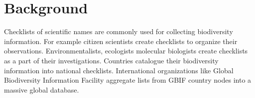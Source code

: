 \documentclass{bmcart}
\begin{document}
\begin{frontmatter}
\begin{abstractbox}
\begin{keyword}
\end{keyword}


\end{abstractbox}
%

\end{frontmatter}


\newpage
\section*{Background}


  Checklists of scientific names are commonly used for collecting biodiversity
  information. For example citizen scientists create checklists to organize
  their observations. Environmentalists, ecologists molecular biologists create
  checklists as a part of their investigations. Countries catalogue their
  biodiversity information into national checklists. International
  organizations like Global Biodiversity Information Facility aggregate lists
  from GBIF country nodes into a massive global database.
\end{document}
